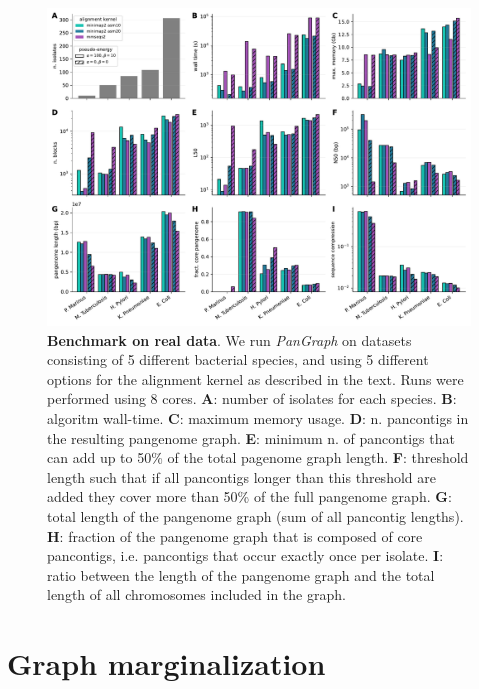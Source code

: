 \documentclass[aps,rmp,reprint,superscriptaddress,notitlepage,10pt,onecolumn]{revtex4-1}
\begin{document}
\begin{figure}[htb]
    \includegraphics[width=\textwidth]{figs_suppl/panx_benchmark_suppl.pdf}
    \caption{{\bf Benchmark on real data}. We run \textit{PanGraph} on datasets consisting of 5 different bacterial species, and using 5 different options for the alignment kernel as described in the text. Runs were performed using 8 cores.
        \textbf{A}: number of isolates for each species.
        \textbf{B}: algoritm wall-time.
        \textbf{C}: maximum memory usage.
        \textbf{D}: n. pancontigs in the resulting pangenome graph.
        \textbf{E}: minimum n. of pancontigs that can add up to 50\% of the total pagenome graph length.
        \textbf{F}: threshold length such that if all pancontigs longer than this threshold are added they cover more than 50\% of the full pangenome graph.
        \textbf{G}: total length of the pangenome graph (sum of all pancontig lengths).
        \textbf{H}: fraction of the pangenome graph that is composed of core pancontigs, i.e. pancontigs that occur exactly once per isolate.
        \textbf{I}: ratio between the length of the pangenome graph and the total length of all chromosomes included in the graph.
    }
    \label{fig:panx-benchmark-suppl}
\end{figure}



\section{Graph marginalization}
\end{document}
